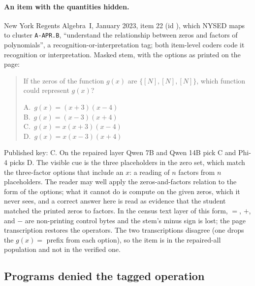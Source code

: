 \paragraph{An item with the quantities hidden.}
New York Regents Algebra~I, January 2023, item 22 (id ), which NYSED maps to cluster \texttt{A-APR.B}, ``understand the relationship between zeros and factors of polynomials'', a recognition-or-interpretation tag; both item-level coders code it recognition or interpretation. Masked stem, with the options as printed on the page:

{\small
\begin{quote}
If the zeros of the function $g(x)$ are $\{[N],[N],[N]\}$, which function could represent $g(x)$?

A.\ $g(x)=(x+3)(x-4)$\\
B.\ $g(x)=(x-3)(x+4)$\\
C.\ $g(x)=x(x+3)(x-4)$\\
D.\ $g(x)=x(x-3)(x+4)$
\end{quote}
}

Published key: C. On the repaired layer Qwen 7B and Qwen 14B pick C and Phi-4 picks D. The visible cue is the three placeholders in the zero set, which match the three-factor options that include an $x$: a reading of $n$ factors from $n$ placeholders. The reader may well apply the zeros-and-factors relation to the form of the options; what it cannot do is compute on the given zeros, which it never sees, and a correct answer here is read as evidence that the student matched the printed zeros to factors. In the census text layer of this form, $=$, $+$, and $-$ are non-printing control bytes and the stem's minus sign is lost; the page transcription restores the operators. The two transcriptions disagree (one drops the $g(x)=$ prefix from each option), so the item is in the repaired-all population and not in the verified one.

\subsection{Programs denied the tagged operation}
\label{sec:census}

